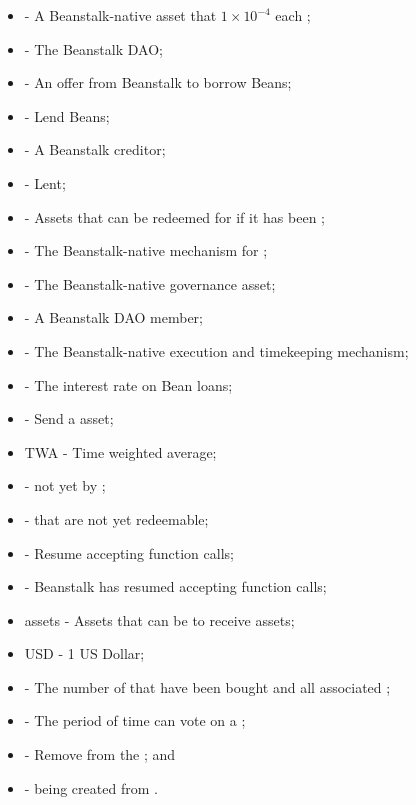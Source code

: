 \documentclass[class=article, crop=false]{standalone}
\begin{document}
\begin{itemize}[topsep=0pt, itemsep=3pt,leftmargin=16pt]
    \item[]  - \hypertarget{ht176}{A Beanstalk-native asset that  $1 \times 10^{-4}$  each };
    \item[]  - \hypertarget{ht177}{The Beanstalk DAO};
    \item[]  - \hypertarget{ht178}{An offer from Beanstalk to borrow Beans};
    \item[]  - \hypertarget{ht179}{Lend Beans};
    \item[]  - \hypertarget{ht180}{A Beanstalk creditor};
    \item[]  - \hypertarget{ht181}{Lent};
    \item[]  - \hypertarget{ht182}{Assets that can be redeemed for  if it has been };
    \item[]  - \hypertarget{ht183}{The Beanstalk-native mechanism for };
    \item[]  - \hypertarget{ht184}{The Beanstalk-native governance asset};
    \item[]  - \hypertarget{ht185}{A Beanstalk DAO member};
    \item[]  - \hypertarget{ht186}{The Beanstalk-native execution and timekeeping mechanism};
    \item[]  - \hypertarget{ht205}{The interest rate on Bean loans};
    \item[]  - \hypertarget{ht206}{Send a  asset};
    \item[] TWA - Time weighted average;
    \item[]  - \hypertarget{ht210}{ not yet  by };
    \item[]  - \hypertarget{ht211}{ that are not yet redeemable};
    \item[]  - \hypertarget{ht212}{Resume accepting  function calls};
    \item[]  - \hypertarget{ht213}{Beanstalk has resumed accepting  function calls};
    \item[]  assets - \hypertarget{ht214}{Assets that can be  to receive  assets};
    \item[] USD - 1 US Dollar;
    \item[]  - \hypertarget{ht215}{The number of  that have been bought and  all associated };
    \item[]  - \hypertarget{ht219}{The period of time  can vote on a };
    \item[]  - \hypertarget{ht220}{Remove from the }; and
    \item[]  - \hypertarget{ht228}{ being created from  \Bean}.
\end{itemize}
\end{document}
